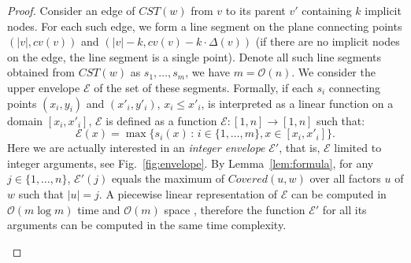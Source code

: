 \documentclass{article}
\theoremstyle{theorem}
\theoremstyle{definition}
\newcommand{\Covered}{\mathit{Covered}}
\newcommand{\CST}{\mathit{CST}}
\renewcommand{\c}{\mathit{cv}}
\newcommand{\Oh}{\mathcal{O}}
\newcommand{\EE}{\mathcal{E}}
\begin{document}
  \begin{proof}
    Consider an edge of $\CST(w)$ from $v$ to its parent $v'$ containing $k$ implicit nodes.
    For each such edge, we form a line segment on the plane connecting points
    $(|v|,\c(v))$ and $(|v|-k,\c(v)-k\cdot\Delta(v))$
    (if there are no implicit nodes on the edge, the line segment is a single point).
    Denote all such line segments obtained from $\CST(w)$ as $s_1,\ldots,s_m$, we have $m=\Oh(n)$.
    We consider the upper envelope $\EE$ of the set of these segments.
    Formally, if each $s_i$ connecting points $(x_i,y_i)$ and $(x'_i,y'_i)$, $x_i \le x'_i$,
    is interpreted as a linear function on a domain $[x_i,x'_i]$,
    $\EE$ is defined as a function $\EE : [1,n] \rightarrow [1,n]$ such that:
    $$\EE(x) = \max\{s_i(x)\,:\, i\in \{1,\ldots,m\}, x \in [x_i,x'_i]\}.$$
    Here we are actually interested in an \emph{integer envelope} $\EE'$, that is, $\EE$
    limited to integer arguments, see Fig.~\ref{fig:envelope}.
    By Lemma~\ref{lem:formula}, for any $j \in \{1,\ldots,n\}$,
    $\EE'(j)$ equals the maximum of $\Covered(u,w)$ over all factors $u$ of $w$
    such that $|u|=j$.
    A piecewise linear representation of $\EE$ can be computed in $\Oh(m\log{m})$ time and $\Oh(m)$ space
    \cite{DBLP:journals/ipl/Hershberger89}, therefore the function $\EE'$ for all its arguments
    can be computed in the same time complexity.

    \begin{figure}[htb]
      \centering
\end{figure}
\end{proof}
\end{document}
